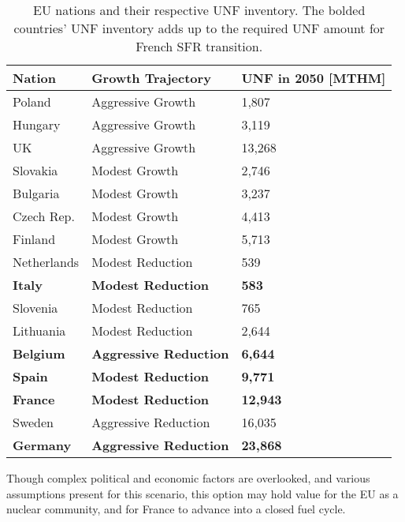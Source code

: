 \begin{table}[h]
    \centering
                \begin{tabularx}{\textwidth}{lbb}
                    \hline 
                    \textbf{Nation} & \textbf{Growth Trajectory} & \small{\textbf{UNF in 2050 [MTHM] }}\\
                    \hline
                    Poland & Aggressive Growth & 1,807\\
                    \hline
                    Hungary & Aggressive Growth & 3,119 \\ 
                    \hline
                    UK & Aggressive Growth & 13,268\\
                    \hline
                    Slovakia & Modest Growth & 2,746\\
                    \hline
                    Bulgaria & Modest Growth & 3,237 \\
                    \hline
                    Czech Rep. & Modest Growth & 4,413\\
                    \hline
                    Finland & Modest Growth &  5,713\\
                    \hline
                    Netherlands & Modest Reduction & 539\\
                    \hline
                    \textbf{Italy} & \textbf{Modest Reduction} & \textbf{583}\\
                    \hline
                    Slovenia & Modest Reduction & 765\\
                    \hline
                    Lithuania & Modest Reduction & 2,644 \\
                    \hline
                    \textbf{Belgium} & \textbf{Aggressive Reduction} & \textbf{6,644}\\
                    \hline 
                    \textbf{Spain} & \textbf{Modest Reduction} &  \textbf{9,771} \\
                    \hline
                    \textbf{France} & \textbf{Modest Reduction} & \textbf{12,943} \\
                    \hline
                    Sweden & Aggressive Reduction & 16,035\\
                    \hline
                    \textbf{Germany} & \textbf{Aggressive Reduction} & \textbf{23,868}\\
                    \hline
                \end{tabularx}
    \caption {\gls{EU} nations and their respective \gls{UNF} inventory. The bolded countries'
              \gls{UNF} inventory adds up to the required \gls{UNF} amount for French \gls{SFR} transition. }
    \label{tab:which_send}

\end{table}

Though complex political and economic factors are overlooked,
 and various assumptions present for this scenario,
this option may hold value for the \gls{EU} as a nuclear community,
and for France to advance into a closed fuel cycle.
